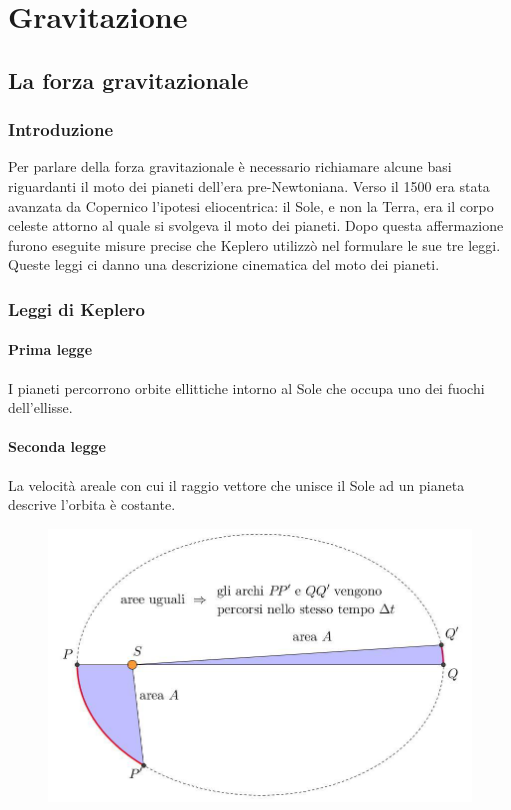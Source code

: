 \documentclass[class=book, crop=false, oneside, 12pt]{standalone}
\begin{document}
\chapter{Gravitazione}

\section{La forza gravitazionale}

\subsection{Introduzione}

Per parlare della forza gravitazionale è necessario richiamare alcune basi riguardanti il moto dei pianeti dell'era pre-Newtoniana.\newline
Verso il 1500 era stata avanzata da Copernico l'ipotesi eliocentrica: il Sole, e non la Terra, era il corpo celeste attorno al quale si svolgeva il moto dei pianeti.\newline
Dopo questa affermazione furono eseguite misure precise che Keplero utilizz\`o nel formulare le sue tre leggi.
Queste leggi ci danno una descrizione cinematica del moto dei pianeti.

\subsection{Leggi di Keplero}
\subsubsection{Prima legge}

I pianeti percorrono orbite ellittiche intorno al Sole che occupa uno dei fuochi dell'ellisse. 

\subsubsection{Seconda legge}

La velocità areale con cui il raggio vettore che unisce il Sole ad un pianeta descrive l'orbita è costante. 

\begin{figure}[h]
    \includegraphics[scale=0.5]{keplero2}
    \centering
    \caption{}
\end{figure}
\end{document}

